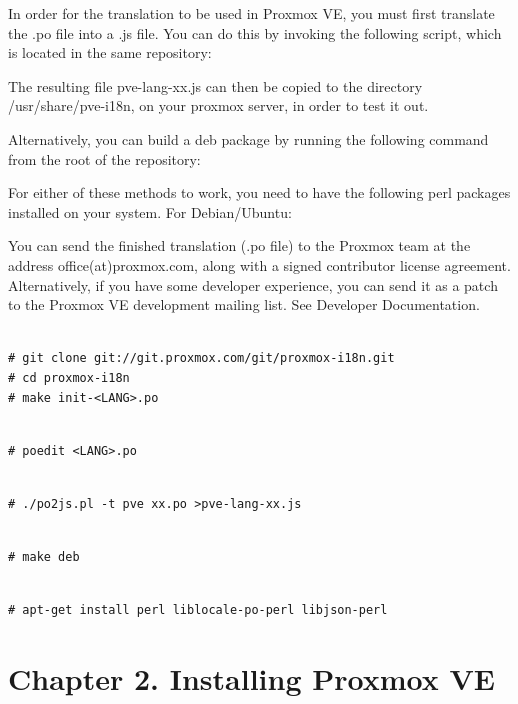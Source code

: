 In order for the translation to be used in Proxmox VE, you must first translate the .po file into a .js file. You can do this by invoking the following script, which is located in the same repository:

The resulting file pve-lang-xx.js can then be copied to the directory /usr/share/pve-i18n, on your proxmox server, in order to test it out.

Alternatively, you can build a deb package by running the following command from the root of the repository:

For either of these methods to work, you need to have the following perl packages installed on your system. For Debian/Ubuntu:

You can send the finished translation (.po file) to the Proxmox team at the address office(at)proxmox.com, along with a signed contributor license agreement. Alternatively, if you have some developer experience, you can send it as a patch to the Proxmox VE development mailing list. See Developer Documentation.

\begin{lstlisting}

# git clone git://git.proxmox.com/git/proxmox-i18n.git
# cd proxmox-i18n
# make init-<LANG>.po

\end{lstlisting}

\begin{lstlisting}

# poedit <LANG>.po

\end{lstlisting}

\begin{lstlisting}

# ./po2js.pl -t pve xx.po >pve-lang-xx.js

\end{lstlisting}

\begin{lstlisting}

# make deb

\end{lstlisting}

\begin{lstlisting}

# apt-get install perl liblocale-po-perl libjson-perl

\end{lstlisting}


\section{Chapter 2. Installing Proxmox VE}

